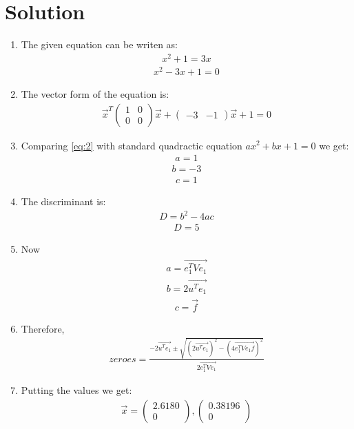 \documentclass[journal,12pt,twocolumn]{IEEEtran}
\newcommand{\myvec}[1]{\ensuremath{\begin{pmatrix}#1\end{pmatrix}}}
\begin{document}
\section{Solution}
\begin{enumerate}
\item The given equation can be writen as:
\begin{align}
    x^2+1=3x
\end{align}
\begin{align}
    x^2-3x+1=0 \label{eq:2}
\end{align}
\item The vector form of the equation is:
\begin{align}
\vec{x}^T\myvec{1&0\\0&0}\vec{x}+\myvec{-3&-1}\vec{x}+1=0
\end{align}
\item Comparing \eqref{eq:2} with standard quadractic equation $ax^2+bx+1=0$ we get:
\begin{align}
    a=1
\end{align}
\begin{align}
    b=-3
\end{align}
\begin{align}
    c=1
\end{align}
\item The discriminant is:
\begin{align}
    D= b^2-4ac
\end{align}
\begin{align}
  D= 5  
\end{align}
\item Now
\begin{align}
    a= \vec{e^T_1Ve_1}
\end{align}
\begin{align}
    b=2\vec{u^Te_1}
\end{align}
\begin{align}
    c=\vec{f}
\end{align}
\item Therefore,
\begin{align}
    zeroes= \frac{-2\vec{u^Te_1} \pm \sqrt{(2\vec{u^Te_1})^2-(4\vec{e^T_1Ve_1f})^2}}{2\vec{e^T_1Ve_1}}
\end{align}
\item Putting the values we get:
\begin{align}
    \vec{x}=\myvec{2.6180\\0},\myvec{0.38196\\0}
\end{align}

\end{enumerate}
\end{document}
